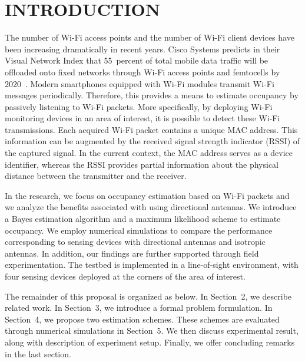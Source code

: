 \chapter[INTRODUCTION]{INTRODUCTION}

The number of Wi-Fi access points and the number of Wi-Fi client devices have been increasing dramatically in recent years.
Cisco Systems predicts in their Visual Network Index that 55~percent of total mobile data traffic will be offloaded onto fixed networks through Wi-Fi access points and femtocells by 2020~\cite{CiscoVNI2016}.
Modern smartphones equipped with Wi-Fi modules transmit Wi-Fi messages periodically.
Therefore, this provides a means to estimate occupancy by passively listening to Wi-Fi packets.
More specifically, by deploying Wi-Fi monitoring devices in an area of interest, it is possible to detect these Wi-Fi transmissions.
Each acquired Wi-Fi packet contains a unique MAC address.
This information can be augmented by the received signal strength indicator (RSSI) of the captured signal.
In the current context, the MAC address serves as a device identifier, whereas the RSSI provides partial information about the physical distance between the transmitter and the receiver.

In the research, we focus on occupancy estimation based on Wi-Fi packets and we analyze the benefits associated with using directional antennas.
We introduce a Bayes estimation algorithm and a maximum likelihood scheme to estimate occupancy.
We employ numerical simulations to compare the performance corresponding to sensing devices with directional antennas and isotropic antennas.
In addition, our findings are further supported through field experimentation.
The testbed is implemented in a line-of-sight environment, with four sensing devices deployed at the corners of the area of interest.

The remainder of this proposal is organized as below.
In Section~2, we describe related work.
In Section~3, we introduce a formal problem formulation.
In Section~4, we propose two estimation schemes.
These schemes are evaluated through numerical simulations in Section~5.
We then discuss experimental result, along with description of experiment setup.
Finally, we offer concluding remarks in the last section.

 






 



